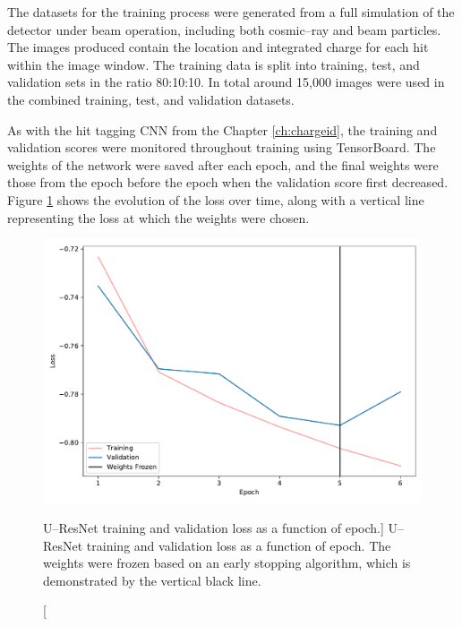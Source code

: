 The datasets for the training process were generated from a full simulation of 
the \protodune{} detector under beam operation, including both cosmic--ray and
beam particles. The images produced contain the location and integrated charge
for each hit within the image window. The training data is split into 
training, test, and validation sets in the ratio 80:10:10. In total around 
15,000 images were used in the combined training, test, and validation datasets.

As with the hit tagging CNN from the Chapter \ref{ch:chargeid}, the training and
validation scores were monitored throughout training using TensorBoard. The
weights of the network were saved after each epoch, and the final weights were
those from the epoch before the epoch when the validation score first decreased.
Figure \ref{fig:unet_loss} shows the evolution of the loss over time, along with
a vertical line representing the loss at which the weights were chosen.
\begin{figure}
	\centering
	\includegraphics[width=\textwidth]{figures/unet_loss.pdf}
	\caption
	[U--ResNet training and validation loss as a function of epoch.]
	{U--ResNet training and validation loss as a function of epoch. The weights were
	frozen based on an early stopping algorithm, which is demonstrated by the
	vertical black line.}
	\label{fig:unet_loss}
\end{figure}

